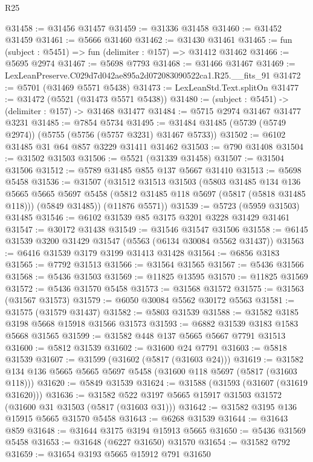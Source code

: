 \begin{lexlean}{R25}
\begin{coremodule}
@31458 := @31456 @31457
@31459 := @31336 @31458
@31460 := @31452 @31459
@31461 := @5666 @31460
@31462 := @31430 @31461
@31465 := fun (subject : @5451) => fun (delimiter : @157) => @31412 @31462
@31466 := @5695 @2974
@31467 := @5698 @7793
@31468 := @31466 @31467
@31469 := LexLeanPreserve.C029d7d042ae895a2d072083090522ca1.R25.__fits_91
@31472 := @5701 (@31469 @5571 @5438)
@31473 := LexLeanStd.Text.splitOn
@31477 := @31472 (@5521 (@31473 @5571 @5438))
@31480 := (subject : @5451) -> (delimiter : @157) -> @31468 @31477
@31484 := @5715 @2974 @31467 @31477 @3231
@31485 := @7854 @5734
@31495 := @31484 @31485 (@5739 (@5749 @2974)) (@5755 (@5756 (@5757 @3231) @31467 @5733))
@31502 := @6102 @31485 @31 @64 @857 @3229 @31411 @31462
@31503 := @790 @31408
@31504 := @31502 @31503
@31506 := @5521 (@31339 @31458)
@31507 := @31504 @31506
@31512 := @5789 @31485 @855 @137 @5667 @31410
@31513 := @5698 @5458
@31536 := @31507
    (@31512
      @31513
      @31503
      (@5803
        @31485
        @134
        @136
        @5665
        @5665
        @5697
        @5458
        (@5812 @31485 @118 @5697 (@5817 (@5818 @31485 @118)))
        (@5849 @31485))
      (@11876 @5571))
@31539 := @5723 (@5959 @31503) @31485
@31546 := @6102 @31539 @85 @3175 @3201 @3228 @31429 @31461
@31547 := @30172 @31438
@31549 := @31546 @31547 @31506
@31558 := @6145 @31539 @3200 @31429 @31547 (@5563 (@6134 @30084 @5562 @31437))
@31563 := @6416 @31539 @3179 @3199 @31413 @31428
@31564 := @6856 @3183
@31565 := @7792 @31513
@31566 := @31564 @31565
@31567 := @5436 @31566
@31568 := @5436 @31503
@31569 := @11825 @13595
@31570 := @11825 @31569
@31572 := @5436 @31570 @5458
@31573 := @31568 @31572
@31575 := @31563 (@31567 @31573)
@31579 := @6050 @30084 @5562 @30172 @5563
@31581 := @31575 (@31579 @31437)
@31582 := @5803 @31539
@31588 := @31582 @3185 @3198 @5668 @15918 @31566 @31573
@31593 := @6882 @31539 @3183 @1583 @5668 @31565
@31599 := @31582 @448 @137 @5665 @5667 @7791 @31513
@31600 := @5812 @31539
@31602 := @31600 @24 @7791
@31603 := @5818 @31539
@31607 := @31599 (@31602 (@5817 (@31603 @24)))
@31619 := @31582 @134 @136 @5665 @5665 @5697 @5458 (@31600 @118 @5697 (@5817 (@31603 @118)))
@31620 := @5849 @31539
@31624 := @31588 (@31593 (@31607 (@31619 @31620)))
@31636 := @31582 @522 @3197 @5665 @15917 @31503 @31572 (@31600 @31 @31503 (@5817 (@31603 @31)))
@31642 := @31582 @3195 @136 @15915 @5665 @31570 @5458
@31643 := @6268 @31539
@31644 := @31643 @859
@31648 := @31644 @3175 @3194 @15913 @5665
@31650 := @5436 @31569 @5458
@31653 := @31648 (@6227 @31650) @31570
@31654 := @31582 @792
@31659 := @31654 @3193 @5665 @15912 @791 @31650

\end{coremodule}
\end{lexlean}
